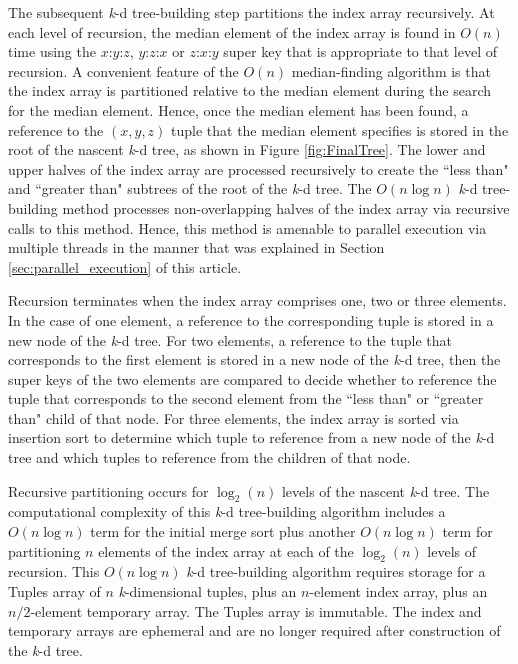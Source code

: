 \documentclass{sig-alternate}
\begin{document}
The subsequent \emph{k}-d tree-building step partitions the index array recursively.  At each level of recursion, the median element of the index array is found in $O\left(n\right)$ time using the $x$:$y$:$z$, $y$:$z$:$x$ or $z$:$x$:$y$ super key that is appropriate to that level of recursion.  A convenient feature of the $O\left(n\right)$ median-finding algorithm is that the index array is partitioned relative to the median element during the search for the median element.  Hence, once the median element has been found, a reference to the $\left(x,y,z\right)$ tuple that the median element specifies is stored in the root of the nascent \emph{k}-d tree, as shown in Figure \ref{fig:FinalTree}.  The lower and upper halves of the index array are processed recursively to create the ``less than" and ``greater than" subtrees of the root of the \emph{k}-d tree.  The $O\left(n \log n\right)$ \emph{k}-d tree-building method processes non-overlapping halves of the index array via recursive calls to this method.  Hence, this method is amenable to parallel execution via multiple threads in the manner that was explained in Section \ref{sec:parallel_execution} of this article.

Recursion terminates when the index array comprises one, two or three elements.  In the case of one element, a reference to the corresponding tuple is stored in a new node of the \emph{k}-d tree.  For two elements, a reference to the tuple that corresponds to the first element is stored in a new node of the \emph{k}-d tree, then the super keys of the two elements are compared to decide whether to reference the tuple that corresponds to the second element from the ``less than" or ``greater than" child of that node.  For three elements, the index array is sorted via insertion sort \cite{Bentley2} to determine which tuple to reference from a new node of the \emph{k}-d tree and which tuples to reference from the children of that node.

Recursive partitioning occurs for $\log_2 \left(n\right)$ levels of the nascent \emph{k}-d tree.  The computational complexity of this \emph{k}-d tree-building algorithm includes a $O\left(n \log n\right)$ term for the initial merge sort plus another $O\left(n \log n\right)$ term for partitioning $n$ elements of the index array at each of the $\log_2 \left(n\right)$ levels of recursion.  This $O\left(n \log n\right)$ \emph{k}-d tree-building algorithm requires storage for a Tuples array of $n$ \emph{k}-dimensional tuples, plus an $n$-element index array, plus an $n/2$-element temporary array.  The Tuples array is immutable.  The index and temporary arrays are ephemeral and are no longer required after construction of the \emph{k}-d tree.
\end{document}
